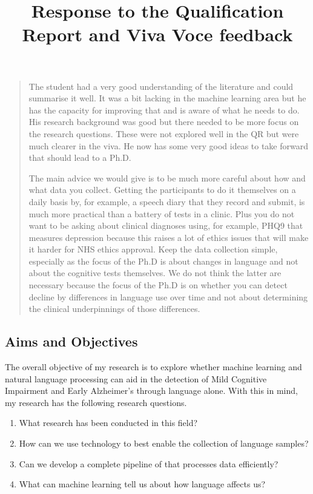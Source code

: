 \documentclass[11pt]{article}
\begin{document}
\title{Response to the Qualification Report and Viva Voce feedback}
\maketitle
\par 
\begin{quote}
The student had a very good understanding of the literature and could summarise it well. It was a bit lacking in the machine learning area but he has the capacity for improving that and is aware of what he needs to do. His research background was good but there needed to be more focus on the research questions. These were not explored well in the QR but were much clearer in the viva. He now has some very good ideas to take forward that should lead to a Ph.D.
\par 
\bigskip
The main advice we would give is to be much more careful about how and what data you collect. Getting the participants to do it themselves on a daily basis by, for example, a speech diary that they record and submit, is much more practical than a battery of tests in a clinic. Plus you do not want to be asking about clinical diagnoses using, for example, PHQ9 that measures depression because this raises a lot of ethics issues that will make it harder for NHS ethics approval. Keep the data collection simple, especially as the focus of the Ph.D is about changes in language and not about the cognitive tests themselves. We do not think the latter are necessary because the focus of the Ph.D is on whether you can detect decline by differences in language use over time and not about determining the clinical underpinnings of those differences.
\end{quote}

\subsection*{Aims and Objectives}
The overall objective of my research is to explore whether machine learning and natural language processing can aid in the detection of Mild Cognitive Impairment and Early Alzheimer's through language alone. With this in mind, my research has the following research questions.

\begin{enumerate}
	\item What research has been conducted in this field?
	\item How can we use technology to best enable the collection of language samples?
	\item Can we develop a complete pipeline of that processes data efficiently?
	\item What can machine learning tell us about how language affects us?
\end{enumerate}
\end{document}
